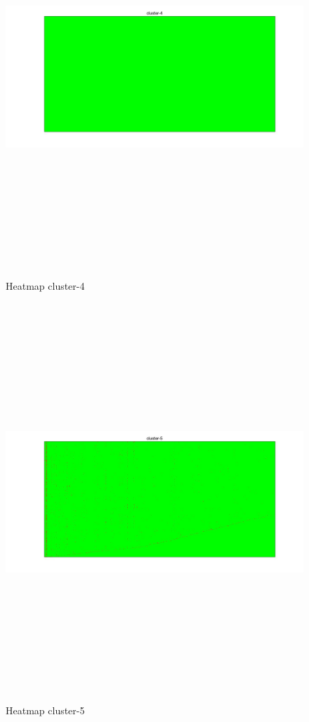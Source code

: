 \begin{figure}[htbp]
	\centering
	\includegraphics[width=\linewidth,height=15cm,keepaspectratio]{analisis/cluster-4.jpg}
	\caption{Heatmap cluster-4}
	\label{pic:cluster-4}
\end{figure}


\begin{figure}[htbp]
	\centering
	\includegraphics[width=\linewidth,height=15cm,keepaspectratio]{analisis/cluster-5.jpg}
	\caption{Heatmap cluster-5}
	\label{pic:cluster-5}
\end{figure}
